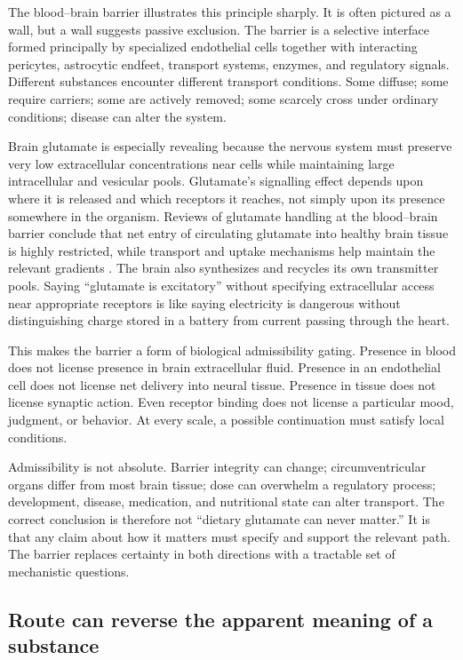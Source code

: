 \documentclass[11pt]{article}
\begin{document}
The blood--brain barrier illustrates this principle sharply. It is often pictured as a wall, but a wall suggests passive exclusion. The barrier is a selective interface formed principally by specialized endothelial cells together with interacting pericytes, astrocytic endfeet, transport systems, enzymes, and regulatory signals. Different substances encounter different transport conditions. Some diffuse; some require carriers; some are actively removed; some scarcely cross under ordinary conditions; disease can alter the system.

Brain glutamate is especially revealing because the nervous system must preserve very low extracellular concentrations near cells while maintaining large intracellular and vesicular pools. Glutamate's signalling effect depends upon where it is released and which receptors it reaches, not simply upon its presence somewhere in the organism. Reviews of glutamate handling at the blood--brain barrier conclude that net entry of circulating glutamate into healthy brain tissue is highly restricted, while transport and uptake mechanisms help maintain the relevant gradients 
\citep{smith2000transport,hawkins2009bbb,danbolt2014glutamate,hawkins2016glutamate}. The brain also synthesizes and recycles its own transmitter pools. Saying ``glutamate is excitatory'' without specifying extracellular access near appropriate receptors is like saying electricity is dangerous without distinguishing charge stored in a battery from current passing through the heart.

This makes the barrier a form of biological admissibility gating. Presence in blood does not license presence in brain extracellular fluid. Presence in an endothelial cell does not license net delivery into neural tissue. Presence in tissue does not license synaptic action. Even receptor binding does not license a particular mood, judgment, or behavior. At every scale, a possible continuation must satisfy local conditions.

Admissibility is not absolute. Barrier integrity can change; circumventricular organs differ from most brain tissue; dose can overwhelm a regulatory process; development, disease, medication, and nutritional state can alter transport. The correct conclusion is therefore not ``dietary glutamate can never matter.'' It is that any claim about how it matters must specify and support the relevant path. The barrier replaces certainty in both directions with a tractable set of mechanistic questions.

\subsection{Route can reverse the apparent meaning of a substance}
\end{document}
